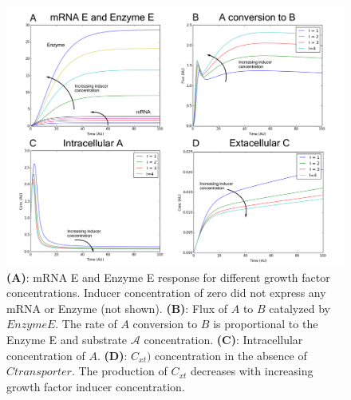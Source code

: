 \documentclass[12pt]{article}
\begin{document}
\clearpage
\begin{figure}[h]
\centering
\includegraphics[width=1.0\textwidth]{./Figures/Figure2_POC_Nogrowth.pdf}
\caption{ \textbf{(A)}: mRNA E and Enzyme E response for different growth factor concentrations. Inducer concentration of zero did not express any mRNA or Enzyme (not shown). \textbf{(B)}: Flux of $A$ to $B$ catalyzed by $Enzyme E$. The rate of $A$ conversion to $B$ is proportional to the Enzyme E and substrate $\mathcal{A}$ concentration. \textbf{(C)}: Intracellular concentration of $A$. \textbf{(D)}: $C_{xt})$ concentration in the absence of $C transporter$. The production of $C_{xt}$ decreases with increasing growth factor inducer concentration.
}\label{fig2-nogrowth}
\end{figure}
\end{document}
